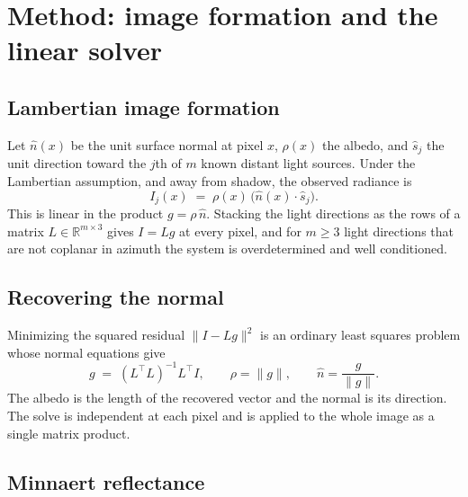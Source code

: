 \documentclass[10pt,twocolumn,letterpaper]{article}
\begin{document}
\section{Method: image formation and the linear solver}

\subsection{Lambertian image formation}

Let $\hat{n}(x)$ be the unit surface normal at pixel $x$, $\rho(x)$ the albedo,
and $\hat{s}_j$ the unit direction toward the $j$th of $m$ known distant light
sources. Under the Lambertian assumption, and away from shadow, the observed
radiance is
%
\begin{equation}
  I_j(x) \;=\; \rho(x)\,\bigl(\hat{n}(x)\cdot\hat{s}_j\bigr).
  \label{eq:lambert}
\end{equation}
%
This is linear in the product $g = \rho\,\hat{n}$. Stacking the light directions
as the rows of a matrix $L \in \mathbb{R}^{m\times3}$ gives $I = Lg$ at every
pixel, and for $m \geq 3$ light directions that are not coplanar in azimuth the
system is overdetermined and well conditioned.

\subsection{Recovering the normal}

Minimizing the squared residual $\lVert I - Lg \rVert^2$ is an ordinary least
squares problem whose normal equations give
%
\begin{equation}
  g \;=\; (L^{\top}L)^{-1}L^{\top}I,
  \qquad
  \rho = \lVert g \rVert,
  \qquad
  \hat{n} = \frac{g}{\lVert g \rVert}.
  \label{eq:woodham}
\end{equation}
%
The albedo is the length of the recovered vector and the normal is its
direction. The solve is independent at each pixel and is applied to the whole
image as a single matrix product.

\subsection{Minnaert reflectance}
\end{document}
